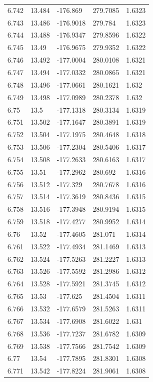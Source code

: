 \begin{tabular}{lllll}
6.742 & 13.484 & -176.869 & 279.7085 & 1.6323 \\
6.743 & 13.486 & -176.9018 & 279.784 & 1.6323 \\
6.744 & 13.488 & -176.9347 & 279.8596 & 1.6322 \\
6.745 & 13.49 & -176.9675 & 279.9352 & 1.6322 \\
6.746 & 13.492 & -177.0004 & 280.0108 & 1.6321 \\
6.747 & 13.494 & -177.0332 & 280.0865 & 1.6321 \\
6.748 & 13.496 & -177.0661 & 280.1621 & 1.632 \\
6.749 & 13.498 & -177.0989 & 280.2378 & 1.632 \\
6.75 & 13.5 & -177.1318 & 280.3134 & 1.6319 \\
6.751 & 13.502 & -177.1647 & 280.3891 & 1.6319 \\
6.752 & 13.504 & -177.1975 & 280.4648 & 1.6318 \\
6.753 & 13.506 & -177.2304 & 280.5406 & 1.6317 \\
6.754 & 13.508 & -177.2633 & 280.6163 & 1.6317 \\
6.755 & 13.51 & -177.2962 & 280.692 & 1.6316 \\
6.756 & 13.512 & -177.329 & 280.7678 & 1.6316 \\
6.757 & 13.514 & -177.3619 & 280.8436 & 1.6315 \\
6.758 & 13.516 & -177.3948 & 280.9194 & 1.6315 \\
6.759 & 13.518 & -177.4277 & 280.9952 & 1.6314 \\
6.76 & 13.52 & -177.4605 & 281.071 & 1.6314 \\
6.761 & 13.522 & -177.4934 & 281.1469 & 1.6313 \\
6.762 & 13.524 & -177.5263 & 281.2227 & 1.6313 \\
6.763 & 13.526 & -177.5592 & 281.2986 & 1.6312 \\
6.764 & 13.528 & -177.5921 & 281.3745 & 1.6312 \\
6.765 & 13.53 & -177.625 & 281.4504 & 1.6311 \\
6.766 & 13.532 & -177.6579 & 281.5263 & 1.6311 \\
6.767 & 13.534 & -177.6908 & 281.6022 & 1.631 \\
6.768 & 13.536 & -177.7237 & 281.6782 & 1.6309 \\
6.769 & 13.538 & -177.7566 & 281.7542 & 1.6309 \\
6.77 & 13.54 & -177.7895 & 281.8301 & 1.6308 \\
6.771 & 13.542 & -177.8224 & 281.9061 & 1.6308 \\

\end{tabular}
